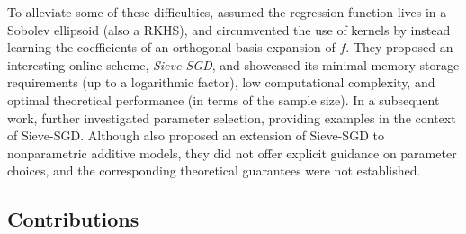 To alleviate some of these difficulties, \cite{zhang2022sieve} assumed the regression function lives in a Sobolev ellipsoid (also a RKHS), and circumvented the use of kernels by instead learning the coefficients of an orthogonal basis expansion of $ f $. They proposed an interesting online scheme, \emph{Sieve-SGD}, and showcased its minimal memory storage requirements (up to a logarithmic factor), low computational complexity, and optimal theoretical performance (in terms of the sample size). In a subsequent work, \citet{zhang2023online} further investigated parameter selection, providing examples in the context of Sieve-SGD. Although \citet{zhang2022sieve} also proposed an extension of Sieve-SGD to nonparametric additive models, they did not offer explicit guidance on parameter choices, and the corresponding theoretical guarantees were not established.


\subsection{Contributions}

